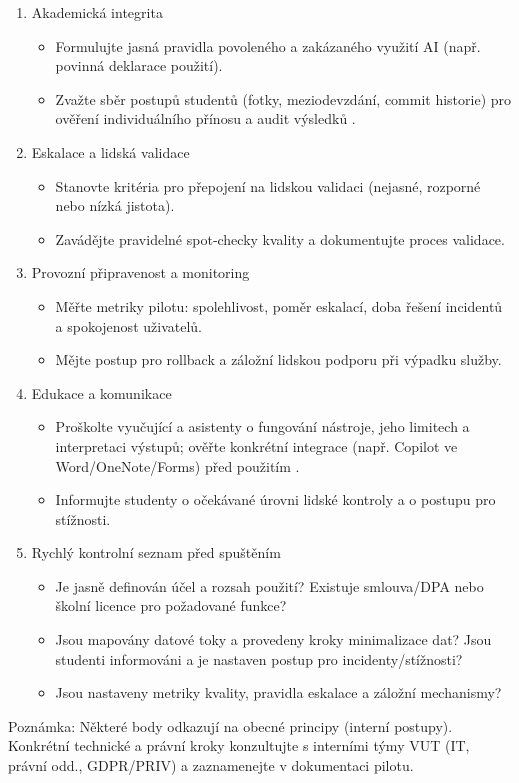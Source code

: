 \begin{enumerate}
  \item Akademická integrita
    \begin{itemize}
      \item Formulujte jasná pravidla povoleného a zakázaného využití AI (např. povinná deklarace použití).
      \item Zvažte sběr postupů studentů (fotky, meziodevzdání, commit historie) pro ověření individuálního přínosu a audit výsledků \cite{kb_ai_101_tipu_pdf_04e4a115_page_8_1}.
    \end{itemize}

  \item Eskalace a lidská validace
    \begin{itemize}
      \item Stanovte kritéria pro přepojení na lidskou validaci (nejasné, rozporné nebo nízká jistota).
      \item Zavádějte pravidelné spot‑checky kvality a dokumentujte proces validace.
    \end{itemize}

  \item Provozní připravenost a monitoring
    \begin{itemize}
      \item Měřte metriky pilotu: spolehlivost, poměr eskalací, doba řešení incidentů a spokojenost uživatelů.
      \item Mějte postup pro rollback a záložní lidskou podporu při výpadku služby.
    \end{itemize}

  \item Edukace a komunikace
    \begin{itemize}
      \item Proškolte vyučující a asistenty o fungování nástroje, jeho limitech a interpretaci výstupů; ověřte konkrétní integrace (např. Copilot ve Word/OneNote/Forms) před použitím \cite{kb_ai_101_tipu_pdf_04e4a115_page_8_1}.
      \item Informujte studenty o očekávané úrovni lidské kontroly a o postupu pro stížnosti.
    \end{itemize}

  \item Rychlý kontrolní seznam před spuštěním
    \begin{itemize}
      \item Je jasně definován účel a rozsah použití? Existuje smlouva/DPA nebo školní licence pro požadované funkce?
      \item Jsou mapovány datové toky a provedeny kroky minimalizace dat? Jsou studenti informováni a je nastaven postup pro incidenty/stížnosti?
      \item Jsou nastaveny metriky kvality, pravidla eskalace a záložní mechanismy?
    \end{itemize}
\end{enumerate}

Poznámka: Některé body odkazují na obecné principy (interní postupy). Konkrétní technické a právní kroky konzultujte s interními týmy VUT (IT, právní odd., GDPR/PRIV) a zaznamenejte v dokumentaci pilotu.